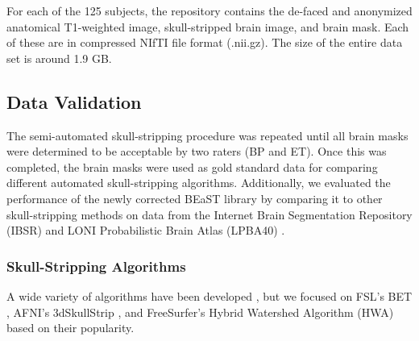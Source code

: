 For each of the 125 subjects, the repository contains the de-faced and anonymized anatomical T1-weighted image, skull-stripped brain image, and brain mask. Each of these are in compressed NIfTI file format (.nii.gz). The size of the entire data set is around 1.9 GB.


\subsection*{Data Validation}

The semi-automated skull-stripping procedure was repeated until all brain masks were determined to be acceptable by two raters (BP and ET). Once this was completed, the brain masks were used as gold standard data for comparing different automated skull-stripping algorithms.  Additionally, we evaluated the performance of the newly corrected BEaST library by comparing it to other skull-stripping methods on data from the Internet Brain Segmentation Repository (IBSR) \cite{IBSR} and LONI Probabilistic Brain Atlas (LPBA40) \cite{lpba40}.


\subsubsection*{Skull-Stripping Algorithms}
A wide variety of algorithms have been developed \cite{Iglesias2011, MASS, Brainwash, Sadananthan2010, Lutkenhoff2014, Wang2014, pmid21195780, bse}, but we focused on FSL's BET \cite{Smith2002}, AFNI's 3dSkullStrip \cite{afni}, and FreeSurfer's Hybrid Watershed Algorithm (HWA) \cite{Segonne2004} based on their popularity.

